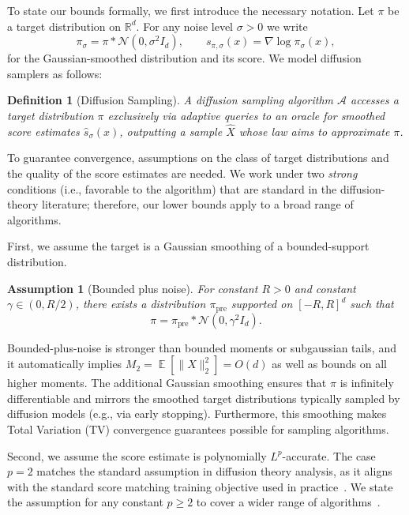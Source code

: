 \documentclass[11pt,letterpaper]{article}
\newtheorem{definition}[theorem]{Definition}
\newtheorem{assumption}{Assumption}
\DeclareMathOperator*{\E}{\mathbb{E}}
\newcommand{\1}{\mathbbm{1}}
\begin{document}
To state our bounds formally, we first introduce the necessary notation. Let $\pi$ be  a target distribution on $\mathbb{R}^d$. For any noise level $\sigma>0$ we write
\[
\pi_\sigma = \pi * \mathcal{N}(0,\sigma^2 I_d),
\qquad
s_{\pi,\sigma}(x)=\nabla \log \pi_\sigma(x),
\]
for the Gaussian-smoothed distribution and its score. We model diffusion samplers as follows:

\begin{definition}[Diffusion Sampling]
A diffusion sampling algorithm $\mathcal{A}$ accesses a target distribution $\pi$ {exclusively} via adaptive queries to an oracle for smoothed score estimates $\widehat s_\sigma(x)$, outputting a sample $\widehat X$ whose law aims to approximate $\pi$.
\end{definition}


To guarantee convergence, assumptions on the class of target distributions and the quality of the score estimates are needed. We work under two \textit{strong} conditions (i.e., favorable to the algorithm) that are standard in the diffusion-theory literature; therefore, our lower bounds apply to a broad range of algorithms.


First, we assume the target is a Gaussian smoothing of a bounded-support distribution.

\begin{assumption}[Bounded plus noise]
  \label{ass:bounded}
  For constant $R > 0$ and constant $\gamma \in (0, R / 2)$, there exists a distribution $\pi_{\mathrm{pre}}$ supported on
  $[-R, R]^d$ such that \[
    \pi = \pi_{\mathrm{pre}} * \mathcal{N}(0, \gamma^2 I_d).
  \]
\end{assumption}

Bounded-plus-noise is stronger than bounded moments or subgaussian tails, and it automatically implies $M_2=\E[\|X\|_2^2]=O(d)$ as well as bounds on all higher moments.
The additional Gaussian smoothing ensures that $\pi$ is infinitely differentiable and mirrors the smoothed target distributions typically sampled by diffusion models (e.g., via early stopping). Furthermore, this smoothing makes Total Variation (TV) convergence guarantees possible for sampling algorithms.



Second, we assume the score estimate is polynomially $L^p$-accurate. The case $p = 2$ matches the standard assumption in diffusion theory analysis, as it aligns with the standard score matching training objective used in practice~\citep{hyvarinen2005score,vincent2011connection,song2019sgm,ho2020ddpm,song2021score_sde,improvedSample}. We state the assumption for any constant $p \ge 2$ to cover a wider range of algorithms~\citep{L41, xun2025posterior}.
\end{document}

